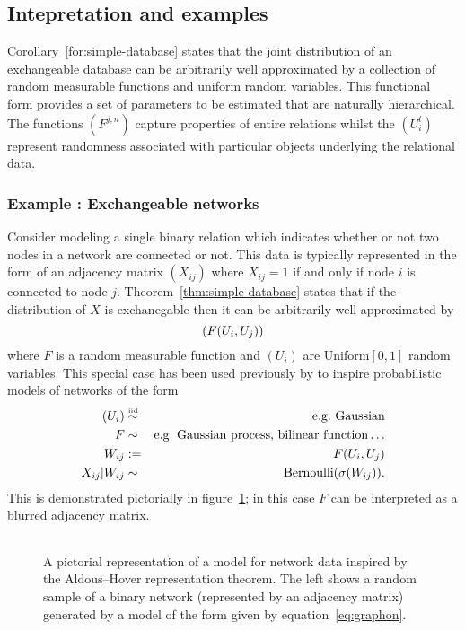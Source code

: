 \subsection{Intepretation and examples}

Corollary~\ref{for:simple-database} states that the joint distribution of an exchangeable database can be arbitrarily well approximated by a collection of random measurable functions and uniform random variables.
This functional form provides a set of parameters to be estimated that are naturally hierarchical.
The functions $(F^{j,n})$ capture properties of entire relations whilst the $(U^t_i)$ represent randomness associated with particular objects underlying the relational data.

\subsubsection{Example : Exchangeable networks}

Consider modeling a single binary relation which indicates whether or not two nodes in a network are connected or not.
This data is typically represented in the form of an adjacency matrix $(X_{ij})$ where $X_{ij} = 1$ if and only if node $i$ is connected to node $j$.
Theorem~\ref{thm:simple-database} states that if the distribution of $X$ is exchanegable then it can be arbitrarily well approximated by
\begin{equation}
(F(U_i, U_j))
\end{equation}
where $F$ is a random measurable function and $(U_i)$ are \iid Uniform$[0,1]$ random variables.
This special case has been used previously by \cite{Hoff2007a,Roy2009,Lloyd2012} to inspire probabilistic models of networks of the form
\begin{eqnarray}
(U_i) & \overset{\mbox{\tiny iid}}{\sim} & \textrm{e.g.\ Gaussian} \\
F & \sim & \textrm{e.g.\ Gaussian process, bilinear function}\ldots \\
W_{ij} & := & F(U_i, U_j) \\
X_{ij} | W_{ij} & \sim & \textrm{Bernoulli}(\sigma(W_{ij}))\label{eq:graphon}.
\end{eqnarray}
This is demonstrated pictorially in figure~\ref{fig:graphon}; in this case $F$ can be interpreted as a blurred adjacency matrix.

\begin{figure}[ht]
\centering
\begin{tabular}{c}

\end{tabular}
\caption{
A pictorial representation of a model for network data inspired by the Aldous--Hover representation theorem.
The left shows a random sample of a binary network (represented by an adjacency matrix) generated by a model of the form given by equation~\eqref{eq:graphon}.
}
\label{fig:graphon}
\end{figure}

